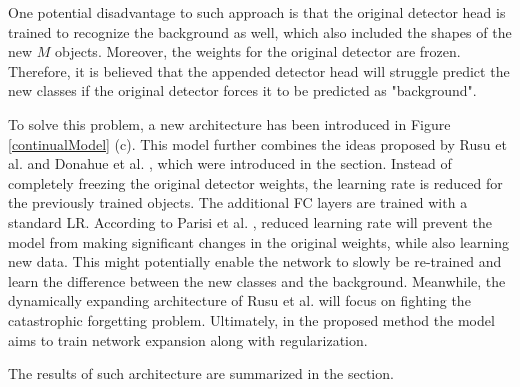 \documentclass[english, 12pt, a4paper, elec, utf8, a-1b, online]{aaltothesis}
\begin{document}
One potential disadvantage to such approach is that the original detector head is trained to recognize the background as well, which also included the shapes of the new $M$ objects. Moreover, the weights for the original detector are frozen. Therefore, it is believed that the appended detector head will struggle predict the new classes if the original detector forces it to be predicted as "background". 

To solve this problem, a new architecture has been introduced in Figure \ref{continualModel} (c). This model further combines the ideas proposed by Rusu et al. \cite{Rusu2016} and Donahue et al. \cite{Donahue2013}, which were introduced in the  section. Instead of completely freezing the original detector weights, the learning rate is reduced for the previously trained objects. The additional FC layers are trained with a standard LR.  According to Parisi et al. \cite{Parisi2018}, reduced learning rate will prevent the model from making significant changes in the original weights, while also learning new data. This might potentially enable the network to slowly be re-trained and learn the difference between the new classes and the background. Meanwhile, the dynamically expanding architecture of Rusu et al. \cite{Rusu2016} will focus on fighting the catastrophic forgetting problem. Ultimately, in the proposed method the model aims to train network expansion along with regularization. 

The results of such architecture are summarized in the  section. 
\end{document}
